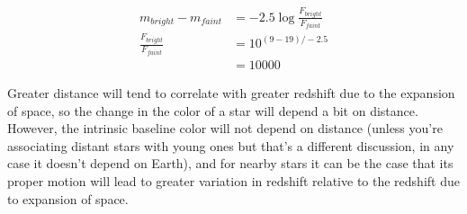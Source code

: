\documentclass{homework}
\begin{document}
\question
\begin{align*}
	m_{bright} - m_{faint}	&=	-2.5 \log{\frac{F_{bright}}{F_{faint}}} \\
	\frac{F_{bright}}{F_{faint}}	&=	10^{(9-19)/-2.5}	\\
	&=	\boxed{10000}
\end{align*}

\question
Greater distance will tend to correlate with greater redshift due to the expansion of space, so the change in the color of a star will depend a bit on distance. However, the intrinsic baseline color will not depend on distance (unless you're associating distant stars with young ones but that's a different discussion, in any case it doesn't depend on Earth), and for nearby stars it can be the case that its proper motion will lead to greater variation in redshift relative to the redshift due to expansion of space.
\end{document}
